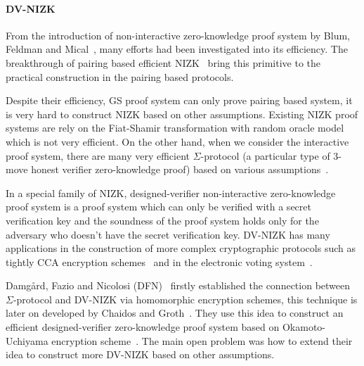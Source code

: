 \paragraph{DV-NIZK}
From the introduction of non-interactive zero-knowledge proof system by Blum, Feldman and Mical~\cite{DBLP:conf/stoc/BlumFM88},
many efforts had been investigated into its efficiency.
The breakthrough of pairing based efficient NIZK~\cite{DBLP:conf/eurocrypt/GrothS08} bring this primitive to the practical construction in the pairing based protocols.

Despite their efficiency, GS proof system can only prove pairing based system, it is very hard to construct NIZK based on other assumptions.
Existing NIZK proof systems are rely on the Fiat-Shamir transformation with random oracle model which is not very efficient.
On the other hand, when we consider the interactive proof system,
there are many very efficient $\Sigma$-protocol (a particular type of 3-move honest verifier zero-knowledge proof) based on various assumptions~\cite{DBLP:journals/iacr/BaumDOP16}\cite{DBLP:conf/crypto/BaumDLN16}.

In a special family of NIZK, designed-verifier non-interactive zero-knowledge proof system is a proof system which can only be verified with a secret verification key
and the soundness of the proof system holds only for the adversary who doesn't have the secret verification key.
DV-NIZK has many applications in the construction of more complex cryptographic protocols such as
tightly CCA encryption schemes~\cite{DBLP:conf/eurocrypt/GayHKW16} and in the electronic voting system~\cite{DBLP:conf/pkc/ChaidosG15}.


Damg\r{a}rd, Fazio and Nicolosi (DFN)~\cite{DBLP:conf/tcc/DamgardFN06} firstly established the connection between $\Sigma$-protocol and DV-NIZK via homomorphic encryption schemes,
this technique is later on developed by Chaidos and Groth~\cite{DBLP:conf/pkc/ChaidosG15}.
They use this idea to construct an efficient designed-verifier zero-knowledge proof system based on Okamoto-Uchiyama encryption scheme~\cite{DBLP:conf/eurocrypt/OkamotoU98}.
The main open problem was how to extend their idea to construct more DV-NIZK based on other assumptions.
